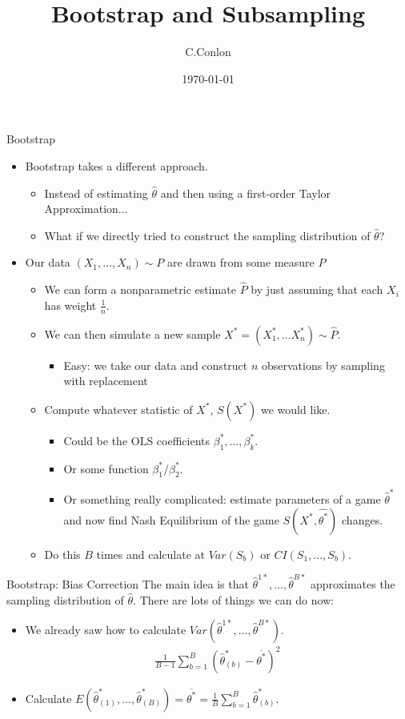 \documentclass[aspectratio=169]{beamer}
\title [Bootstrap]{Bootstrap and Subsampling}
\author{C.Conlon}
\institute{Applied Econometrics II}
\date{\today}
\begin{document}
\begin{frame}
\titlepage
\end{frame}

\begin{frame}{Bootstrap}
\begin{itemize}
\item Bootstrap takes a different approach.
\begin{itemize}
\item Instead of estimating $\hat{\theta}$ and then using a first-order Taylor Approximation...
\item What if we directly tried to construct the \alert{sampling distribution} of $\hat{\theta}$?
\end{itemize}
\item Our data $(X_1,\ldots,X_n) \sim P$ are drawn from some measure $P$
\begin{itemize}
\item We can form a \alert{nonparametric estimate} $\hat{P}$ by just assuming that each $X_i$ has weight $\frac{1}{n}$.
\item We can then simulate a new sample $X^{*} = (X_1^{*},\ldots X_n^{*}) \sim \hat{P}$.
\begin{itemize}
\item Easy: we take our data and construct $n$ observations by \alert{sampling with replacement} 
\end{itemize}
\item Compute whatever statistic of $X^{*}$, $S(X^*)$ we would like.
\begin{itemize}
\item Could be the OLS coefficients $\beta_1^{*},\ldots, \beta_k^{*}$.
\item Or some function $\beta_1^{*}/\beta_2^{*}$.
\item Or something really complicated: estimate parameters of a game $\hat{\theta}^*$ and now find Nash Equilibrium of the game $S(X^{*},\hat{\theta^*})$ changes.
\end{itemize}
\item Do this $B$ times and calculate at $Var(S_b)$ or $CI(S_1,\ldots, S_b)$.
\end{itemize}
\end{itemize}
\end{frame}


\begin{frame}{Bootstrap: Bias Correction}
\small
The main idea is that $\hat{\theta}^{1*},\ldots, \hat{\theta}^{B*}$ approximates the \alert{sampling distribution} of $\hat{\theta}$. There are lots of things we can do now:
\begin{itemize}
\item We already saw how to calculate $Var(\hat{\theta}^{1*},\ldots, \hat{\theta}^{B*})$.
\begin{eqnarray*}
\frac{1}{B-1} \sum_{b=1}^B (\hat{\theta}_{(b)}^* - \overline{\theta^{*}})^2
\end{eqnarray*}
\item Calculate $E(\hat{\theta}^{*}_{(1)},\ldots, \hat{\theta}^{*}_{(B)}) = \overline{\theta^{*}} = \frac{1}{B} \sum_{b=1}^B \hat{\theta}_{(b)}^*$.
\end{itemize}
\end{frame}
\end{document}
